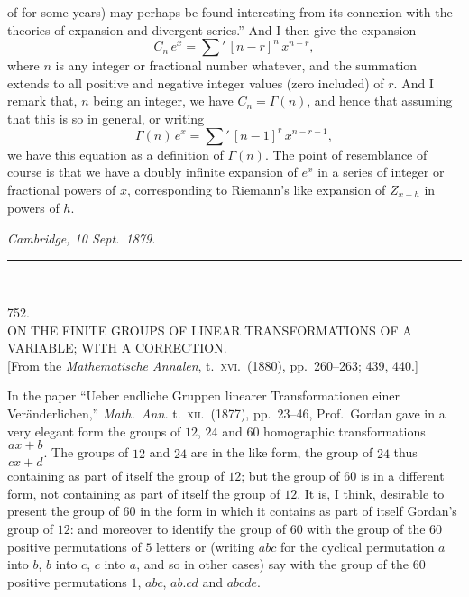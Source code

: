 \documentclass[11pt,a4paper]{article}
\begin{document}
of for some years) may perhaps be found interesting from its connexion with
the theories of expansion and divergent series.''  And I then give the
expansion
\[
  C_{n}\, e^{x} = \sum'\, [n - r]^{n}\, x^{n - r},
\]
where $n$ is any integer or fractional number whatever, and the summation
extends to all positive and negative integer values (zero included) of $r$.
And I remark that, $n$ being an integer, we have $C_{n} = \Gamma(n)$, and
hence that assuming that this is so in general, or writing
\[
  \Gamma(n)\, e^{x} = \sum'\, [n - 1]^{r}\, x^{n - r - 1},
\]
we have this equation as a definition of $\Gamma(n)$.  The point of
resemblance of course is that we have a doubly infinite expansion of $e^{x}$
in a series of integer or fractional powers of $x$, corresponding to
Riemann's like expansion of $Z_{x+h}$ in powers of $h$.

\medskip

\noindent\textit{Cambridge, 10 Sept.\ 1879.}

\bigskip
\noindent\rule{0.35\textwidth}{0.4pt}\\[2pt]


\bigskip

\begin{center}
\textsc{752.}\\[6pt]
\textsc{ON THE FINITE GROUPS OF LINEAR TRANSFORMATIONS OF
A VARIABLE; WITH A CORRECTION.}\\[6pt]
[From the \emph{Mathematische Annalen}, t.\ \textsc{xvi}.\ (1880),
pp.\ 260--263; 439, 440.]
\end{center}

\bigskip

\noindent
In the paper ``Ueber endliche Gruppen linearer Transformationen einer
Ver\"anderlichen,'' \emph{Math.\ Ann.} t.\ \textsc{xii}.\ (1877), pp.\ 23--46,
Prof.\ Gordan gave in a very elegant form the groups of $12$, $24$ and $60$
homographic transformations $\dfrac{ax + b}{cx + d}$.  The groups of $12$ and
$24$ are in the like form, the group of $24$ thus containing as part of
itself the group of $12$; but the group of $60$ is in a different form, not
containing as part of itself the group of $12$.  It is, I think, desirable
to present the group of $60$ in the form in which it contains as part of
itself Gordan's group of $12$: and moreover to identify the group of $60$
with the group of the $60$ positive permutations of $5$ letters or (writing
$abc$ for the cyclical permutation $a$ into $b$, $b$ into $c$, $c$ into $a$,
and so in other cases) say with the group of the $60$ positive permutations
$1$, $abc$, $ab.cd$ and $abcde$.
\end{document}

